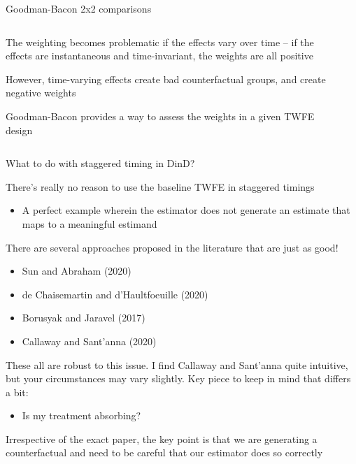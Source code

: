 \documentclass[notes,11pt, aspectratio=169]{beamer}
\newenvironment{wideitemize}{\itemize\addtolength{\itemsep}{10pt}}{\enditemize}
\begin{document}
\begin{frame}{Goodman-Bacon 2x2 comparisons}
  \begin{columns}[T] %
    \begin{column}{0.4\textwidth}
      \begin{wideitemize}
      \item<1-> The weighting becomes problematic if the effects vary
        over time -- if the effects are instantaneous and
        time-invariant, the weights are all positive
      \item<2-> However, time-varying effects create bad
        counterfactual groups, and create negative weights
      \item<2-> Goodman-Bacon provides a way to assess the weights in
        a given TWFE design
      \end{wideitemize}
    \end{column}%
    \hfill%
    \begin{column}{.6\textwidth}
    \end{column}%
  \end{columns}
\end{frame}


\begin{frame}{What to do with staggered timing in DinD?}
  \begin{wideitemize}
  \item There's really no reason to use the baseline TWFE in staggered timings
    \begin{itemize}
    \item A perfect example wherein the estimator does not generate an
      estimate that maps to a meaningful estimand
    \end{itemize}
  \item There are several approaches proposed in the literature that are just as good!
    \begin{itemize}
    \item Sun and Abraham (2020)
    \item de Chaisemartin and  d'Haultfoeuille (2020)
    \item Borusyak and Jaravel (2017)
    \item Callaway and Sant'anna (2020)      
    \end{itemize}
  \item These all are robust to this issue. I find Callaway and
    Sant'anna quite intuitive, but your circumstances may vary
    slightly. Key piece to keep in mind that differs a bit: 
    \begin{itemize}
    \item Is my treatment absorbing?
    \end{itemize}
  \item Irrespective of the exact paper, the key point is that we are
    generating a counterfactual and need to be careful that our
    estimator does so correctly
  \end{wideitemize}
\end{frame}
\end{document}

